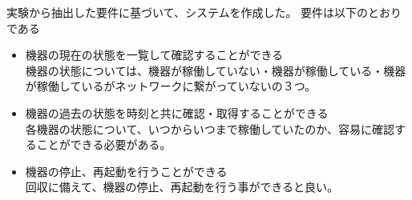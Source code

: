 実験から抽出した要件に基づいて、システムを作成した。
要件は以下のとおりである
\begin{itemize}
	\item 機器の現在の状態を一覧して確認することができる\\
		機器の状態については、機器が稼働していない・機器が稼働している・機器が稼働しているがネットワークに繋がっていないの３つ。
	\item 機器の過去の状態を時刻と共に確認・取得することができる\\
		各機器の状態について、いつからいつまで稼働していたのか、容易に確認することができる必要がある。
	\item 機器の停止、再起動を行うことができる\\
		回収に備えて、機器の停止、再起動を行う事ができると良い。
\end{itemize}

